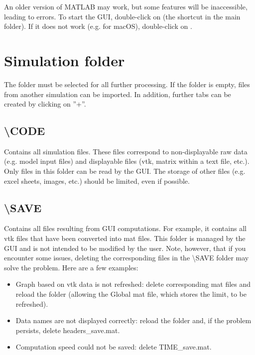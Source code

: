 \documentclass{article}
\begin{document}
An older version of MATLAB may work, but some features will be inaccessible, leading to errors. To start the GUI, double-click on  (the shortcut in the main folder). If it does not work (e.g. for macOS), double-click on .

\section{Simulation folder}

The folder must be selected for all further processing. If the folder is empty, files from another simulation can be imported. In addition, further tabs can be created by clicking on ''+''.

\subsection{\textbackslash CODE}

Contains all simulation files. These files correspond to non-displayable raw data (e.g. model input files) and displayable files (vtk, matrix within a text file, etc.). Only files in this folder can be read by the GUI. The storage of other files (e.g. excel sheets, images, etc.) should be limited, even if possible.

\subsection{\textbackslash SAVE}

Contains all files resulting from GUI computations. For example, it contains all vtk files that have been converted into mat files. This folder is managed by the GUI and is not intended to be modified by the user. Note, however, that if you encounter some issues, deleting the corresponding files in the \textbackslash SAVE folder may solve the problem. Here are a few examples:

\begin{itemize}
    \item Graph based on vtk data is not refreshed: delete corresponding mat files and reload the folder (allowing the Global mat file, which stores the limit, to be refreshed).
    \item Data names are not displayed correctly: reload the folder and, if the problem persists, delete headers\_save.mat. 
    \item Computation speed could not be saved: delete TIME\_save.mat.
\end{itemize}
\end{document}

